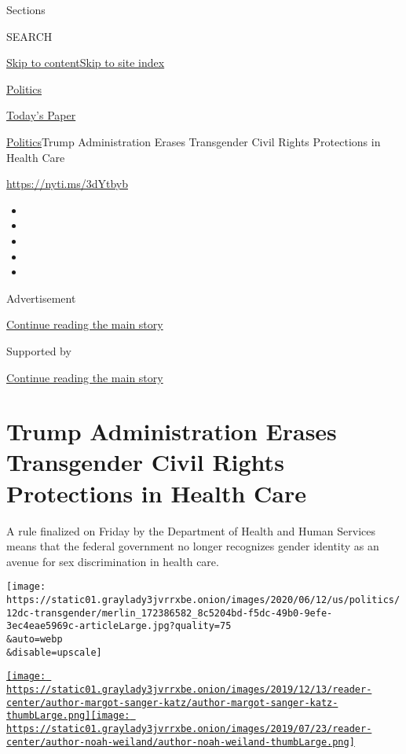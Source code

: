 Sections

SEARCH

\protect\hyperlink{site-content}{Skip to
content}\protect\hyperlink{site-index}{Skip to site index}

\href{https://www.nytimes3xbfgragh.onion/section/politics}{Politics}

\href{https://myaccount.nytimes3xbfgragh.onion/auth/login?response_type=cookie\&client_id=vi}{}

\href{https://www.nytimes3xbfgragh.onion/section/todayspaper}{Today's
Paper}

\href{/section/politics}{Politics}\textbar{}Trump Administration Erases
Transgender Civil Rights Protections in Health Care

\url{https://nyti.ms/3dYtbyb}

\begin{itemize}
\item
\item
\item
\item
\item
\end{itemize}

Advertisement

\protect\hyperlink{after-top}{Continue reading the main story}

Supported by

\protect\hyperlink{after-sponsor}{Continue reading the main story}

\hypertarget{trump-administration-erases-transgender-civil-rights-protections-in-health-care}{%
\section{Trump Administration Erases Transgender Civil Rights
Protections in Health
Care}\label{trump-administration-erases-transgender-civil-rights-protections-in-health-care}}

A rule finalized on Friday by the Department of Health and Human
Services means that the federal government no longer recognizes gender
identity as an avenue for sex discrimination in health care.

\texttt{[image: https://static01.graylady3jvrrxbe.onion/images/2020/06/12/us/politics/12dc-transgender/merlin\_172386582\_8c5204bd-f5dc-49b0-9efe-3ec4eae5969c-articleLarge.jpg?quality=75\\\&auto=webp\\\&disable=upscale]}

\href{https://www.nytimes3xbfgragh.onion/by/margot-sanger-katz}{\texttt{[image: https://static01.graylady3jvrrxbe.onion/images/2019/12/13/reader-center/author-margot-sanger-katz/author-margot-sanger-katz-thumbLarge.png]}}\href{https://www.nytimes3xbfgragh.onion/by/noah-weiland}{\texttt{[image: https://static01.graylady3jvrrxbe.onion/images/2019/07/23/reader-center/author-noah-weiland/author-noah-weiland-thumbLarge.png]}}

